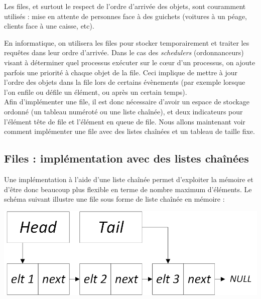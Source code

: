\smallskip

Les files, et surtout le respect de l'ordre d'arrivée des objets, sont couramment utilisés : mise en attente de personnes face à des guichets (voitures à un péage, clients face à une caisse, etc).

En informatique, on utilisera les files pour stocker temporairement et traiter les requêtes dans leur ordre d'arrivée.
Dans le cas des \textit{schedulers} (ordonnanceurs) visant à déterminer quel processus exécuter sur le c\oe{}ur d'un processus, on ajoute parfois une priorité à chaque objet de la file.
Ceci implique de mettre à jour l'ordre des objets dans la file lors de certains évènements (par exemple lorsque l'on enfile ou défile un élément, ou après un certain temps).\\

Afin d'implémenter une file, il est donc nécessaire d'avoir un espace de stockage ordonné (un tableau numéroté ou une liste chaînée), et deux indicateurs pour l'élément tête de file et l'élément en queue de file.
Nous allons maintenant voir comment implémenter une file avec des listes chaînées et un tableau de taille fixe.

\bigskip


\subsection{Files : implémentation avec des listes chaînées}

\bigskip

Une implémentation à l'aide d'une liste chaînée permet d'exploiter la mémoire et d'être donc beaucoup plus flexible en terme de nombre maximum d'éléments.
Le schéma suivant illustre une file sous forme de liste chaînée en mémoire :\\

\begin{center}
\includegraphics[scale=0.75]{Cours/Files_3_Liste_Chainee_Structure_cas_general.png}
\end{center}

